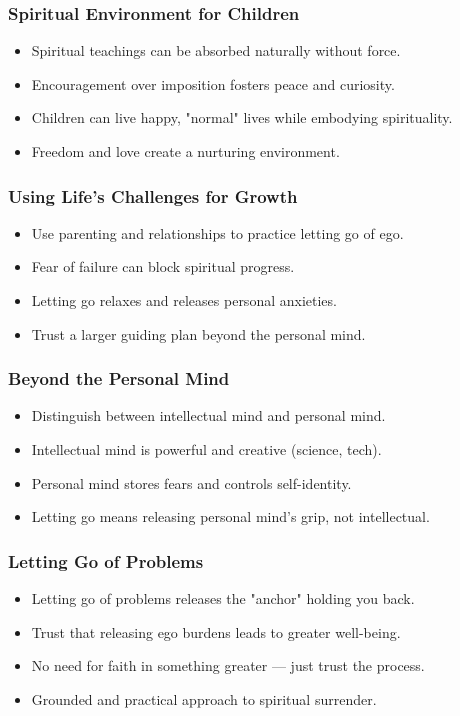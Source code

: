 \begin{frame}[fragile]\frametitle{Spiritual Environment for Children}
  \begin{itemize}
    \item Spiritual teachings can be absorbed naturally without force.
    \item Encouragement over imposition fosters peace and curiosity.
    \item Children can live happy, "normal" lives while embodying spirituality.
    \item Freedom and love create a nurturing environment.
  \end{itemize}
\end{frame}

\begin{frame}[fragile]\frametitle{Using Life’s Challenges for Growth}
  \begin{itemize}
    \item Use parenting and relationships to practice letting go of ego.
    \item Fear of failure can block spiritual progress.
    \item Letting go relaxes and releases personal anxieties.
    \item Trust a larger guiding plan beyond the personal mind.
  \end{itemize}
\end{frame}

\begin{frame}[fragile]\frametitle{Beyond the Personal Mind}
  \begin{itemize}
    \item Distinguish between intellectual mind and personal mind.
    \item Intellectual mind is powerful and creative (science, tech).
    \item Personal mind stores fears and controls self-identity.
    \item Letting go means releasing personal mind's grip, not intellectual.
  \end{itemize}
\end{frame}

\begin{frame}[fragile]\frametitle{Letting Go of Problems}
  \begin{itemize}
    \item Letting go of problems releases the "anchor" holding you back.
    \item Trust that releasing ego burdens leads to greater well-being.
    \item No need for faith in something greater — just trust the process.
    \item Grounded and practical approach to spiritual surrender.
  \end{itemize}
\end{frame}

